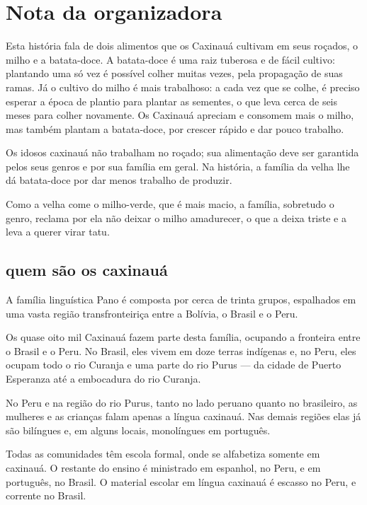 

\chapter{Nota da organizadora}

Esta história fala de dois alimentos que os Caxinauá cultivam em seus roçados, o milho e a batata-doce. A batata-doce é uma raiz tuberosa e de fácil cultivo: plantando uma só vez é possível colher muitas vezes, pela propagação de suas ramas. Já o cultivo do milho é mais trabalhoso: a cada vez que se colhe, é preciso esperar a época de plantio para plantar as sementes, o que leva cerca de seis meses para colher novamente. Os Caxinauá apreciam e consomem mais o milho, mas também plantam a batata-doce, por crescer rápido e dar pouco trabalho.

Os idosos caxinauá não trabalham no roçado; sua alimentação deve ser garantida pelos seus genros e por sua família em geral. Na história, a família da velha lhe dá batata-doce
por dar menos trabalho de produzir.

Como a velha come o milho-verde, que é mais macio, a família, sobretudo o genro, reclama por ela não deixar o milho amadurecer, o que a deixa triste e a leva a querer virar tatu.

\section{quem são os caxinauá}

A família linguística Pano é composta por cerca de trinta grupos, espalhados em uma vasta região transfronteiriça entre a Bolívia, o Brasil e o Peru.

Os quase oito mil Caxinauá fazem parte desta família, ocupando a fronteira entre o Brasil
e o Peru. No Brasil, eles vivem em doze terras indígenas e, no Peru, eles ocupam todo o rio Curanja e uma parte do rio Purus --- da cidade de Puerto Esperanza até a embocadura
do rio Curanja.

No Peru e na região do rio Purus, tanto no lado peruano quanto no brasileiro, as mulheres e as crianças falam apenas a língua caxinauá. Nas demais regiões elas já são bilíngues e, em alguns locais,
monolíngues em português.

Todas as comunidades têm escola formal, onde se alfabetiza somente em caxinauá. O
restante do ensino é ministrado em espanhol, no Peru, e em português, no Brasil. O material escolar em língua caxinauá é escasso no Peru, e corrente no Brasil.
